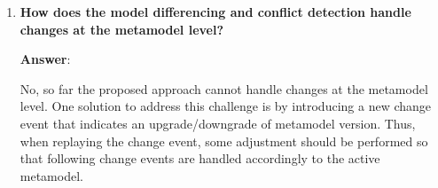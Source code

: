 \begin{enumerate}
  \item \textbf{How does the model differencing and conflict detection handle changes at the metamodel level?}
  
  \textbf{Answer}:
  
  No, so far the proposed approach cannot handle changes at the metamodel level. One solution to address this challenge is by introducing a new change event that indicates an upgrade/downgrade of metamodel version. Thus, when replaying the change event, some adjustment should be performed so that following change events are handled accordingly to the active metamodel.
 
\end{enumerate}